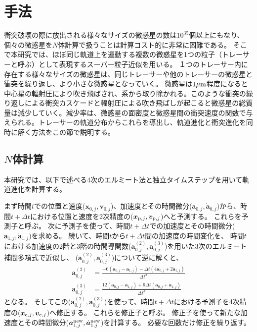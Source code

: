 \documentclass[a4paper,10pt,oneside,twocolumn,notitlepage,final]{jarticle}
\begin{document}
\section{手法}
衝突破壊の際に放出される様々なサイズの微惑星の数は$10^{35}$個以上にもなり、個々の微惑星を$N$体計算で扱うことは計算コスト的に非常に困難である。
そこで本研究では、ほぼ同じ軌道上を運動する複数の微惑星を1つの粒子（トレーサーと呼ぶ）として表現するスーパー粒子近似を用いる。
１つのトレーサー内に存在する様々なサイズの微惑星は、同じトレーサーや他のトレーサーの微惑星と衝突を繰り返し、より小さな微惑星となっていく。
微惑星は$1\mu {\rm m}$程度になると中心星の輻射圧により吹き飛ばされ、系から取り除かれる。このような衝突の繰り返しによる衝突カスケードと輻射圧による吹き飛ばしが起こると微惑星の総質量は減少していく。減少率は、微惑星の面密度と微惑星間の衝突速度の関数で与えられる\citep{Kobayashi_Tanaka_2010}。トレーサーの軌道分布からこれらを導出し、軌道進化と衝突進化を同時に解く方法をこの節で説明する。

\subsection{$N$体計算}
本研究では、以下で述べる4次のエルミート法\citep{Makino_Aarseth_1992}と独立タイムステップを用いて軌道進化を計算する。

まず時間$t$での位置と速度(${\bm x}_{0,j},{\bm v}_{0,j}$)、加速度とその時間微分(${\bm a}_{0,j},\dot{{\bm a}}_{0,j}$)から、時間$t + \Delta t$における位置と速度を2次精度の(${\bm x}_{{\rm p},j} , {\bm v}_{{\rm p},j}$)へと予測する。
これらを予測子と呼ぶ。
次に予測子を使って、時間$t + \Delta t$での加速度とその時間微分(${\bm a}_{1,j},\dot{{\bm a}}_{1,j}$)を求める。
続いて、時間$t$から$t+\Delta t$間の加速度の時間変化を、
時間$t$における加速度の2階と3階の時間導関数(${\bm a}_{0,j}^{(2)},{\bm a}_{0,j}^{(3)}$)を用いた3次のエルミート補間多項式で近似し、
(${\bm a}_{0,j}^{(2)},{\bm a}_{0,j}^{(3)}$)について逆に解くと、
\begin{align}
{\bm a}_{0,j}^{(2)} &= \frac{- 6 ({\bm a}_{0,j} - {\bm a}_{1,j}) - \Delta t (4 \dot{{\bm a}}_{0,j} + 2 \dot{{\bm a}}_{1,j})}{\Delta t ^2}\\
{\bm a}_{0,j}^{(3)} &= \frac{12 ({\bm a}_{0,j} - {\bm a}_{1,j}) + 6 \Delta t (\dot{{\bm a}}_{0,j} + \dot{{\bm a}}_{1,j})}{\Delta t ^3}
\end{align}
となる。
そしてこの(${\bm a}_{0,j}^{(2)},{\bm a}_{0,j}^{(3)}$)を使って、時間$t + \Delta t$における予測子を4次精度の(${\bm x}_{{\rm c},j} , {\bm v}_{{\rm c},j}$)へ修正する。
これらを修正子と呼ぶ。
修正子を使って新たな加速度とその時間微分(${\bm a}_{1,j}^{\rm new},\dot{{\bm a}}_{1,j}^{\rm new}$)を計算する。
必要な回数だけ修正を繰り返す。
\end{document}
